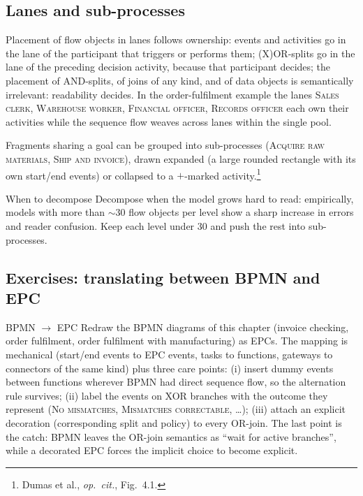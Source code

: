 \subsection{Lanes and sub-processes}

Placement of flow objects in lanes follows ownership: events and activities go in the lane of the participant that triggers or performs them; (X)OR-splits go in the lane of the preceding decision activity, because that participant decides; the placement of AND-splits, of joins of any kind, and of data objects is semantically irrelevant: readability decides. In the order-fulfilment example the lanes \textsc{Sales clerk}, \textsc{Warehouse worker}, \textsc{Financial officer}, \textsc{Records officer} each own their activities while the sequence flow weaves across lanes within the single pool.

Fragments sharing a goal can be grouped into sub-processes (\textsc{Acquire raw materials}, \textsc{Ship and invoice}), drawn expanded (a large rounded rectangle with its own start/end events) or collapsed to a $+$-marked activity.\footnote{Dumas et al., \emph{op.~cit.}, Fig.~4.1.}

\begin{notebox}{When to decompose}
Decompose when the model grows hard to read: empirically, models with more than $\sim$30 flow objects per level show a sharp increase in errors and reader confusion. Keep each level under 30 and push the rest into sub-processes.
\end{notebox}

\subsection{Exercises: translating between BPMN and EPC}

\begin{examplebox}{BPMN $\to$ EPC}
Redraw the BPMN diagrams of this chapter (invoice checking, order fulfilment, order fulfilment with manufacturing) as EPCs. The mapping is mechanical (start/end events to EPC events, tasks to functions, gateways to connectors of the same kind) plus three care points: (i) insert dummy events between functions wherever BPMN had direct sequence flow, so the alternation rule survives; (ii) label the events on XOR branches with the outcome they represent (\textsc{No mismatches}, \textsc{Mismatches correctable}, \dots); (iii) attach an explicit decoration (corresponding split and policy) to every OR-join. The last point is the catch: BPMN leaves the OR-join semantics as ``wait for active branches'', while a decorated EPC forces the implicit choice to become explicit.
\end{examplebox}

